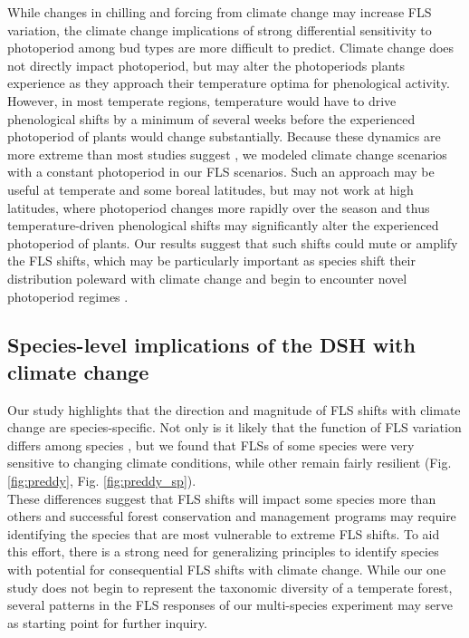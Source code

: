 \documentclass[11pt]{article}\usepackage[]{graphicx}\usepackage[]{color}
\begin{document}
\noindent While changes in chilling and forcing from climate change may increase FLS variation, the climate change implications of strong differential sensitivity to photoperiod among bud types are more difficult to predict. Climate change does not directly impact photoperiod, but may alter the photoperiods plants experience as they approach their temperature optima for phenological activity. However, in most temperate regions, temperature would have to drive phenological shifts by a minimum of several weeks before the experienced photoperiod of plants would change substantially. %
Because these dynamics are more extreme than most studies suggest \citep{Thackeray:2016aa}, we modeled climate change scenarios with a constant photoperiod in our FLS scenarios. Such an approach may be useful at temperate and some boreal latitudes, but may not work at high latitudes, where photoperiod changes more rapidly over the season and thus temperature-driven phenological shifts may significantly alter the experienced photoperiod of plants. Our results suggest that such shifts could mute or amplify the FLS shifts, which may be particularly important as species shift their distribution poleward with climate change and begin to encounter novel photoperiod regimes \citep{WAY:2015aa}.\\

\subsection*{Species-level implications of the DSH with climate change}
\noindent  Our study highlights that the direction and magnitude of FLS shifts with climate change are species-specific. Not only is it likely that the function of FLS variation differs among species \citep{Buonaiuto2020}, but we found that FLSs of some species were very sensitive to changing climate conditions, while other remain fairly resilient (Fig. \ref{fig:preddy}, Fig. \ref{fig:preddy_sp}).\\

\noident These differences suggest that FLS shifts will impact some species more than others and successful forest conservation and management programs may require identifying the species that are most vulnerable to extreme FLS shifts. To aid this effort, there is a strong need for generalizing principles to identify species with potential for consequential FLS shifts with climate change. While our one study does not begin to represent the taxonomic diversity of a temperate forest, several patterns in the FLS responses of our multi-species experiment may serve as starting point for further inquiry.\\ 
\end{document}
